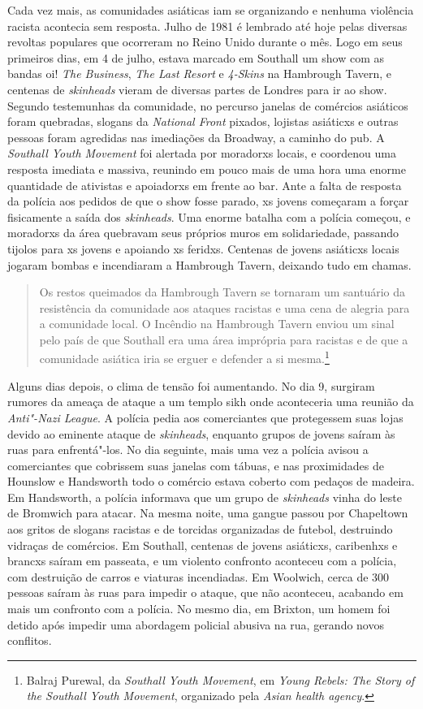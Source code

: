 Cada vez mais, as comunidades asiáticas iam se organizando e nenhuma violência racista acontecia sem resposta. Julho de 1981 é lembrado até hoje pelas diversas revoltas populares que ocorreram no Reino Unido durante o mês. Logo em seus primeiros dias, em 4 de julho, estava marcado em Southall um show com as bandas oi! \emph{The Business}, \emph{The Last Resort} e \emph{4-Skins} na Hambrough Tavern, e centenas de \emph{skinheads} vieram de diversas partes de Londres para ir ao show. Segundo testemunhas da comunidade, no percurso janelas de comércios asiáticos foram quebradas, slogans da \emph{National Front} pixados, lojistas asiáticxs e outras pessoas foram agredidas nas imediações da Broadway, a caminho do pub. A \emph{Southall Youth Movement} foi alertada por moradorxs locais, e coordenou uma resposta imediata e massiva, reunindo em pouco mais de uma hora uma enorme quantidade de ativistas e apoiadorxs em frente ao bar. Ante a falta de resposta da polícia aos pedidos de que o show fosse parado, xs jovens começaram a forçar fisicamente a saída dos \emph{skinheads}. Uma enorme batalha com a polícia começou, e moradorxs da área quebravam seus próprios muros em solidariedade, passando tijolos para xs jovens e apoiando xs feridxs. Centenas de jovens asiáticxs locais jogaram bombas e incendiaram a Hambrough Tavern, deixando tudo em chamas.

\begin{quote}
Os restos queimados da Hambrough Tavern se tornaram um santuário da resistência da comunidade aos ataques racistas e uma cena de alegria para a comunidade local. O Incêndio na Hambrough Tavern enviou um sinal pelo país de que Southall era uma área imprópria para racistas e de que a comunidade asiática iria se erguer e defender a si mesma.\footnote{Balraj Purewal, da \emph{Southall Youth Movement}, em \emph{Young Rebels: The Story of the Southall Youth Movement}, organizado pela \emph{Asian health agency}.}
\end{quote}

Alguns dias depois, o clima de tensão foi aumentando. No dia 9, surgiram rumores da ameaça de ataque a um templo sikh onde aconteceria uma reunião da \emph{Anti"-Nazi League}. A polícia pedia aos comerciantes que protegessem suas lojas devido ao eminente ataque de \emph{skinheads}, enquanto grupos de jovens saíram às ruas para enfrentá"-los. No dia seguinte, mais uma vez a polícia avisou a comerciantes que cobrissem suas janelas com tábuas, e nas proximidades de Hounslow e Handsworth todo o comércio estava coberto com pedaços de madeira. Em Handsworth, a polícia informava que um grupo de \emph{skinheads} vinha do leste de Bromwich para atacar. Na mesma noite, uma gangue passou por Chapeltown aos gritos de slogans racistas e de torcidas organizadas de futebol, destruindo vidraças de comércios. Em Southall, centenas de jovens asiáticxs, caribenhxs e brancxs saíram em passeata, e um violento confronto aconteceu com a polícia, com destruição de carros e viaturas incendiadas. Em Woolwich, cerca de 300 pessoas saíram às ruas para impedir o ataque, que não aconteceu, acabando em mais um confronto com a polícia. No mesmo dia, em Brixton, um homem foi detido após impedir uma abordagem policial abusiva na rua, gerando novos conflitos.


